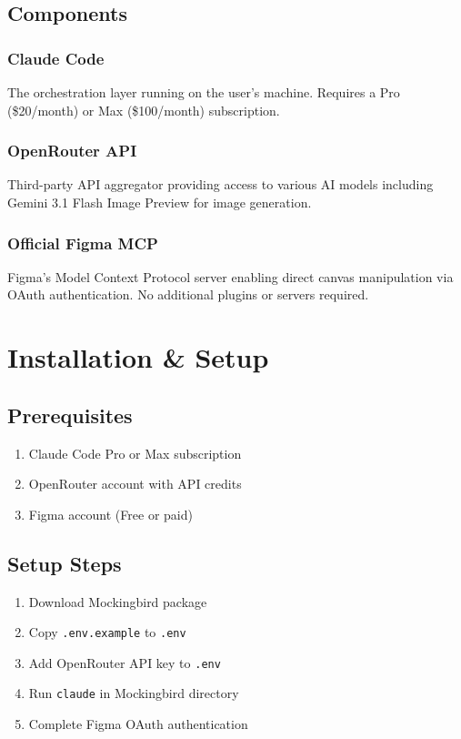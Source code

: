 \documentclass[11pt,a4paper]{article}
\begin{document}
\subsection{Components}

\subsubsection{Claude Code}
The orchestration layer running on the user's machine. Requires a Pro (\$20/month) or Max (\$100/month) subscription.

\subsubsection{OpenRouter API}
Third-party API aggregator providing access to various AI models including Gemini 3.1 Flash Image Preview for image generation.

\subsubsection{Official Figma MCP}
Figma's Model Context Protocol server enabling direct canvas manipulation via OAuth authentication. No additional plugins or servers required.

\section{Installation \& Setup}

\subsection{Prerequisites}
\begin{enumerate}
    \item Claude Code Pro or Max subscription
    \item OpenRouter account with API credits
    \item Figma account (Free or paid)
\end{enumerate}

\subsection{Setup Steps}
\begin{enumerate}
    \item Download Mockingbird package
    \item Copy \texttt{.env.example} to \texttt{.env}
    \item Add OpenRouter API key to \texttt{.env}
    \item Run \texttt{claude} in Mockingbird directory
    \item Complete Figma OAuth authentication
\end{enumerate}
\end{document}
